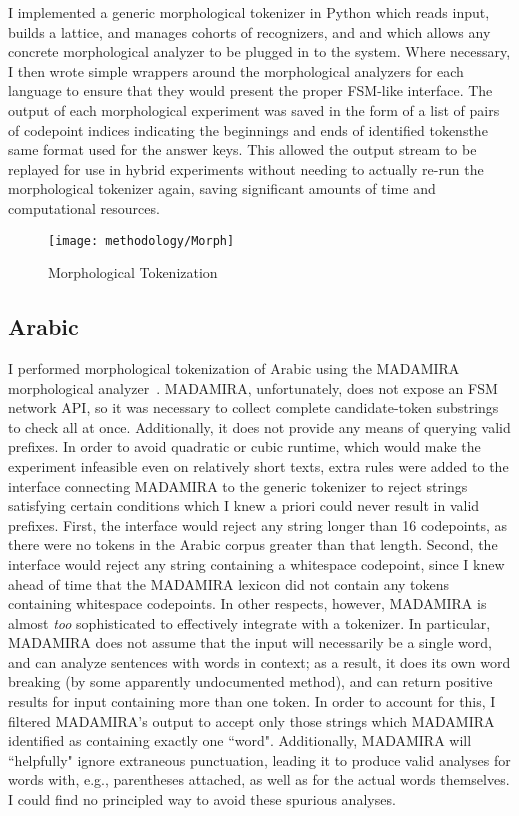 I implemented a generic morphological tokenizer in Python which reads input, builds a lattice, and manages cohorts of recognizers, and and which allows any concrete morphological analyzer to be plugged in to the system. Where necessary, I then wrote simple wrappers around the morphological analyzers for each language to ensure that they would present the proper FSM-like interface.
The output of each morphological experiment was saved in the form of a list of pairs of codepoint indices indicating the beginnings and ends of identified tokens\textemdash the same format used for the answer keys. This allowed the output stream to be replayed for use in hybrid experiments without needing to actually re-run the morphological tokenizer again, saving significant amounts of time and computational resources.

\begin{figure}
	\texttt{[image: methodology/Morph]}
	\caption{Morphological Tokenization}
	\label{morphdiagram}
\end{figure}

\subsection{Arabic}
I performed morphological tokenization of Arabic using the MADAMIRA morphological analyzer~\cite{pasha14}. MADAMIRA, unfortunately, does not expose an FSM network API, so it was necessary to collect complete candidate-token substrings to check all at once. Additionally, it does not provide any means of querying valid prefixes. In order to avoid quadratic or cubic runtime, which would make the experiment infeasible even on relatively short texts, extra rules were added to the interface connecting MADAMIRA to the generic tokenizer to reject strings satisfying certain conditions which I knew a priori could never result in valid prefixes. First, the interface would reject any string longer than 16 codepoints, as there were no tokens in the Arabic corpus greater than that length. Second, the interface would reject any string containing a whitespace codepoint, since I knew ahead of time that the MADAMIRA lexicon did not contain any tokens containing whitespace codepoints.
In other respects, however, MADAMIRA is almost \textit{too} sophisticated to effectively integrate with a tokenizer. In particular, MADAMIRA does not assume that the input will necessarily be a single word, and can analyze sentences with words in context; as a result, it does its own word breaking (by some apparently undocumented method), and can return positive results for input containing more than one token. In order to account for this, I filtered MADAMIRA's output to accept only those strings which MADAMIRA identified as containing exactly one ``word". Additionally, MADAMIRA will ``helpfully" ignore extraneous punctuation, leading it to produce valid analyses for words with, e.g., parentheses attached, as well as for the actual words themselves. I could find no principled way to avoid these spurious analyses.

